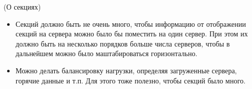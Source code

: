 \begin{remark}(О секциях)
    \enewline
    \begin{itemize}
        \item Секций должно быть не очень много, чтобы информацию от отображении
            секций на сервера можно было бы поместить на один сервер. При этом
            их должно быть на несколько порядков больше числа серверов,
            чтобы в дальнейшем можно было маштабироваться горизонтально.
        \item Можно делать балансировку нагрузки, определяя загруженные сервера,
            горячие данные и т.п. Для этого тоже полезно, чтобы секций было много.
    \end{itemize}
\end{remark}
